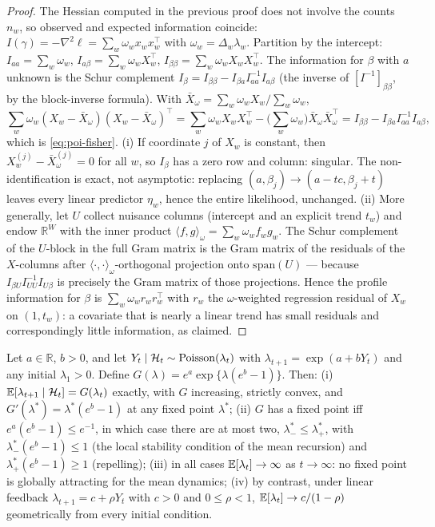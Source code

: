 \begin{proof}
The Hessian computed in the previous proof does not involve the counts $n_w$, so observed and
expected information coincide: $I(\gamma) = -\nabla^2\ell = \sum_w \omega_w x_w x_w^\top$ with
$\omega_w = \Delta_w \lambda_w$. Partition by the intercept: $I_{aa} = \sum_w \omega_w$, $I_{a\beta}
= \sum_w \omega_w X_w^\top$, $I_{\beta\beta} = \sum_w \omega_w X_w X_w^\top$. The information for
$\beta$ with $a$ unknown is the Schur complement $I_\beta = I_{\beta\beta} - I_{\beta a} I_{aa}^{-1}
I_{a\beta}$ (the inverse of $[I^{-1}]_{\beta\beta}$, by the block-inverse formula). With $\bar
X_\omega = \sum_w \omega_w X_w / \sum_w \omega_w$,
\[
\sum_w \omega_w (X_w - \bar X_\omega)(X_w - \bar X_\omega)^\top
= \sum_w \omega_w X_w X_w^\top - \Big(\sum_w \omega_w\Big) \bar X_\omega \bar X_\omega^\top
= I_{\beta\beta} - I_{\beta a} I_{aa}^{-1} I_{a\beta},
\]
which is \eqref{eq:poi-fisher}. (i) If coordinate $j$ of $X_w$ is constant, then $X_w^{(j)} - \bar
X_\omega^{(j)} = 0$ for all $w$, so $I_\beta$ has a zero row and column: singular. The
non-identification is exact, not asymptotic: replacing $(a, \beta_j) \to (a - tc, \beta_j + t)$
leaves every linear predictor $\eta_w$, hence the entire likelihood, unchanged. (ii) More generally,
let $U$ collect nuisance columns (intercept and an explicit trend $t_w$) and endow $\mathbb{R}^W$
with the inner product $\langle f, g \rangle_\omega = \sum_w \omega_w f_w g_w$. The Schur complement
of the $U$-block in the full Gram matrix is the Gram matrix of the residuals of the $X$-columns
after $\langle\cdot,\cdot\rangle_\omega$-orthogonal projection onto $\mathrm{span}(U)$ --- because
$I_{\beta U} I_{UU}^{-1} I_{U \beta}$ is precisely the Gram matrix of those projections. Hence the
profile information for $\beta$ is $\sum_w \omega_w r_w r_w^\top$ with $r_w$ the $\omega$-weighted
regression residual of $X_w$ on $(1, t_w)$: a covariate that is nearly a linear trend has small
residuals and correspondingly little information, as claimed.
\end{proof}

\begin{proposition}
\label{prop:app-loglink}
Let $a \in \mathbb{R}$, $b > 0$, and let $Y_t \mid \mathcal{H}_t \sim \mathrm{Poisson}(\lambda_t)$ with
$\lambda_{t+1} = \exp(a + b Y_t)$ and any initial $\lambda_1 > 0$. Define $G(\lambda) = e^{a}
\exp\{\lambda (e^{b} - 1)\}$. Then: (i) $\mathbb{E}[\lambda_{t+1} \mid \mathcal{H}_t] = G(\lambda_t)$ exactly,
with $G$ increasing, strictly convex, and $G'(\lambda^*) = \lambda^* (e^b - 1)$ at any fixed point
$\lambda^*$; (ii) $G$ has a fixed point iff $e^{a}(e^{b}-1) \le e^{-1}$, in which case there are at
most two, $\lambda^*_- \le \lambda^*_+$, with $\lambda^*_-(e^b - 1) \le 1$ (the local stability
condition of the mean recursion) and $\lambda^*_+(e^b - 1) \ge 1$ (repelling); (iii) in all cases
$\mathbb{E}[\lambda_t] \to \infty$ as $t \to \infty$: no fixed point is globally attracting for the mean
dynamics; (iv) by contrast, under linear feedback $\lambda_{t+1} = c + \rho Y_t$ with $c > 0$ and $0
\le \rho < 1$, $\mathbb{E}[\lambda_t] \to c/(1-\rho)$ geometrically from every initial condition.
\end{proposition}

